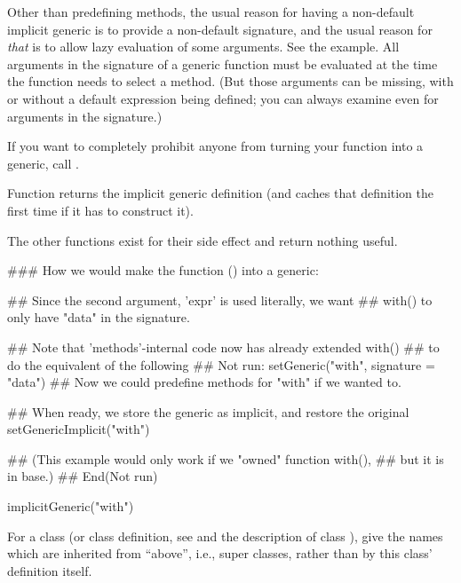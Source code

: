 \begin{Details}
Other than predefining  methods, the usual reason for having a
non-default implicit generic is to provide a non-default signature,
and the usual reason for \emph{that} is to allow lazy evaluation of
some arguments.  See the example.  All arguments in the signature of a
generic function must be evaluated at the time the function needs to
select a method.  (But those arguments can be missing, with or without
a default expression being defined; you can always examine
 even for arguments in the signature.)

If you want to completely prohibit anyone from turning your function
into a generic, call .
\end{Details}
%
\begin{Value}
Function  returns the implicit generic
definition (and caches that definition the first time if it has to
construct it).

The other functions exist for their side effect and return nothing
useful.
\end{Value}
%
\begin{SeeAlso}\relax
{}
\end{SeeAlso}
%
\begin{Examples}
\begin{ExampleCode}

### How we would make the function () into a generic:

## Since the second argument, 'expr' is used literally, we want
## with() to only have "data" in the signature.

## Note that 'methods'-internal code now has already extended  with()
## to do the equivalent of the following
## Not run: 
setGeneric("with", signature = "data")
## Now we could predefine methods for "with" if we wanted to.

## When ready, we store the generic as implicit, and restore the original
setGenericImplicit("with")

## (This example would only work if we "owned" function with(),
##  but it is in base.)
## End(Not run)

implicitGeneric("with")
\end{ExampleCode}
\end{Examples}
%
\begin{Description}\relax
For a class (or class definition, see  and
the description of class ),
give the names which are inherited from ``above'', i.e., super
classes, rather than by this class' definition itself.
\end{Description}
